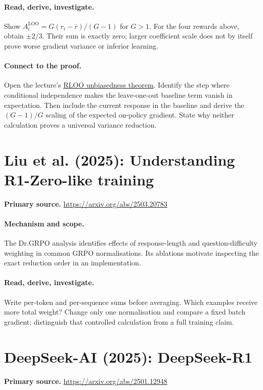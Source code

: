 \documentclass[11pt]{scrartcl}
\begin{document}
\paragraph{Read, derive, investigate.} Show $A_i^{\mathrm{LOO}}=G(r_i-\bar r)/(G-1)$ for $G>1$. For the four rewards above, obtain $\pm2/3$. Their sum is exactly zero; larger coefficient scale does not by itself prove worse gradient variance or inferior learning.

\paragraph{Connect to the proof.}
Open the lecture's \href{notes.tex#thm:rloo-unbiased}{RLOO unbiasedness theorem}.
Identify the step where conditional independence makes the leave-one-out
baseline term vanish in expectation. Then include the current response in
the baseline and derive the $(G-1)/G$ scaling of the expected on-policy
gradient. State why neither calculation proves a universal variance reduction.

\section{Liu et al. (2025): Understanding R1-Zero-like training}
\noindent\textbf{Primary source.} \url{https://arxiv.org/abs/2503.20783}

\paragraph{Mechanism and scope.} The Dr.GRPO analysis identifies effects of response-length and question-difficulty weighting in common GRPO normalisations. Its ablations motivate inspecting the exact reduction order in an implementation.

\paragraph{Read, derive, investigate.} Write per-token and per-sequence sums before averaging. Which examples receive more total weight? Change only one normalisation and compare a fixed batch gradient; distinguish that controlled calculation from a full training claim.

\section{DeepSeek-AI (2025): DeepSeek-R1}
\noindent\textbf{Primary source.} \url{https://arxiv.org/abs/2501.12948}
\end{document}
